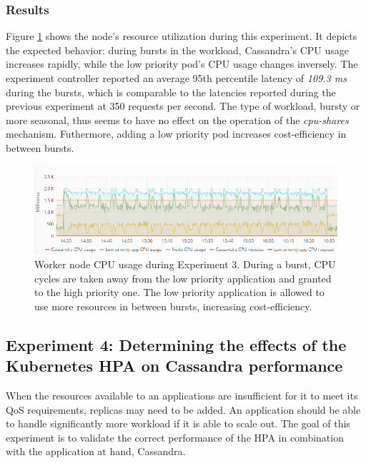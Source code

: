 \subsubsection{Results}
Figure \ref{fig:cpu-cas-lpp-bursty} shows the node's resource utilization during this experiment. It depicts the expected behavior: during bursts in the workload, Cassandra's CPU usage increases rapidly, while the low priority pod's CPU usage changes inversely. The experiment controller reported an average 95th percentile latency of \textit{109.3 ms} during the bursts, which is comparable to the latencies reported during the previous experiment at 350 requests per second. The type of workload, bursty or more seasonal, thus seems to have no effect on the operation of the \textit{cpu-shares} mechanism. Futhermore, adding a low priority pod increases cost-efficiency in between bursts.

\begin{figure}
\centering
\includegraphics[width=\columnwidth]{Images/Experiments/CPU/Grafana/cpu-cas-lpp-bursty.PNG}
\caption{Worker node CPU usage during Experiment 3. During a burst, CPU cycles are taken away from the low priority application and granted to the high priority one. The low priority application is allowed to use more resources in between bursts, increasing cost-efficiency.}
\label{fig:cpu-cas-lpp-bursty}
\end{figure}

\subsection{Experiment 4: Determining the effects of the Kubernetes HPA on Cassandra performance}
\label{exp:hpa-cass}
When the resources available to an applications are insufficient for it to meet its QoS requirements, replicas may need to be added. An application should be able to handle significantly more workload if it is able to scale out. The goal of this experiment is to validate the correct performance of the HPA in combination with the application at hand, Cassandra. 

